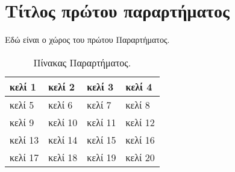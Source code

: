 \chapter{Τίτλος πρώτου παραρτήματος}
\label{app:FirstAppendix}
\minitoc

Εδώ είναι ο χώρος του πρώτου Παραρτήματος.

\begin{table}[h]
	\centering
	\caption{Πίνακας Παραρτήματος.}
	\label{tab:AppendixTable}
	\begin{tabular}{| l || l | l | l |}
		\hline
		κελί 1 & κελί 2 & κελί 3 & κελί 4\\
		\hline
		\hline
		κελί 5 & κελί 6 & κελί 7 & κελί 8\\
		\hline
		κελί 9 & κελί 10 & κελί 11 & κελί 12\\
		\hline
		κελί 13 & κελί 14 & κελί 15 & κελί 16\\
		\hline
		κελί 17 & κελί 18 & κελί 19 & κελί 20\\
		\hline
	\end{tabular}
\end{table}